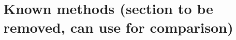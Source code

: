 











\vspace{60pt}

\section{Known methods (section to be removed, can use for comparison)}







